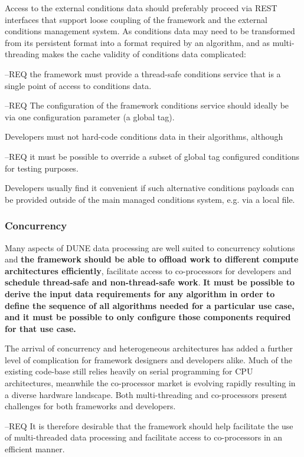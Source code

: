 \documentclass[../main-v1.tex]{subfiles}
\begin{document}
Access to the external conditions data should preferably proceed via REST interfaces that support loose coupling of the framework and the external conditions management system.  As conditions data may need to be transformed from its persistent format into a format required by an algorithm, and as multi-threading makes the cache validity of conditions data complicated: 

--REQ the framework must provide a thread-safe conditions service that is a single point of access to conditions data.  

--REQ The configuration of the framework conditions service should ideally be via one configuration parameter (a global tag). 

Developers must not hard-code conditions data in their algorithms, although 

--REQ it must be possible to override a subset of global tag configured conditions for testing purposes.  

Developers usually find it convenient if such alternative conditions payloads can be provided outside of the main managed conditions system, e.g. via a local file.


\subsubsection{Concurrency} %
Many aspects of DUNE data processing are well suited to concurrency solutions and {\bf the framework should be able to offload work to different compute architectures efficiently}, facilitate access to co-processors for developers and {\bf schedule thread-safe and non-thread-safe work}.  {\bf It must be possible to derive the input data requirements for any algorithm in order to define the sequence of all algorithms needed for a particular use case, and it must be possible to only configure those components required for that use case.}

The arrival of concurrency and heterogeneous architectures has added a further level of complication for framework designers and developers alike.  Much of the existing code-base still relies heavily on serial programming for CPU architectures, meanwhile the co-processor market is evolving rapidly resulting in a diverse hardware landscape.  Both multi-threading and co-processors present challenges for both frameworks and developers.  

--REQ It is therefore desirable that the framework should help facilitate the use of multi-threaded data processing and facilitate access to co-processors in an efficient manner. 
\end{document}
